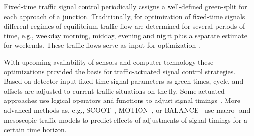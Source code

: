Fixed-time traffic signal control periodically assigns a well-defined green-split for each approach of a junction. 
Traditionally, for optimization of fixed-time signals different regimes of equilibrium traffic flow are determined for several periods of time, e.g., weekday morning, midday, evening and night plus a separate estimate for weekends.   
These traffic flows serve as input for optimization~\citep[e.g.~][]{Webster1961SignalSettings,Allsop1972SignalizedJunctionCapacity,Allsop1991SignalsStageBased,Robertson1969Transyt}.  

With upcoming availability of sensors and computer technology these optimizations provided the basis for traffic-actuated signal control strategies. 
Based on detector input fixed-time signal parameters as green times, cycle, and offsets are adjusted to current traffic situations on the fly. 
Some actuated approaches use logical operators and functions to adjust signal timings~\citep{Friedrich2002VerkehrsadaptiveLSASteuerung}. More advanced methods as, e.g., SCOOT~\citep{HuntEtc1981SCOOT,RobertsonBretherton1991ScootMethod,BrethertonBodgerBaber2004ScootFuture}, MOTION~\citep{BielefeldtBusch1994MOTION,BuschKruse2001MotionSITRAFFIC,BrilonEtAl2009MotionMuenster}, or BALANCE~\citep{GEVAS2011Balance,BraunEtAl2009TravolutionLSA2CarCommunication} use macro- and mesoscopic traffic models to predict effects of adjustments of signal timings for a certain time horizon.  
%


